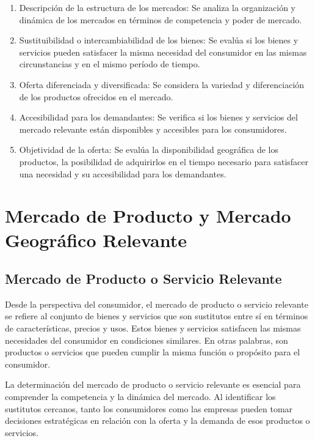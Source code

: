 \documentclass[
  letterpaper,
  DIV=11,
  numbers=noendperiod]{scrartcl}
\begin{document}
\begin{enumerate}
\def\labelenumi{\arabic{enumi}.}
\item
  Descripción de la estructura de los mercados: Se analiza la
  organización y dinámica de los mercados en términos de competencia y
  poder de mercado.
\item
  Sustituibilidad o intercambiabilidad de los bienes: Se evalúa si los
  bienes y servicios pueden satisfacer la misma necesidad del consumidor
  en las mismas circunstancias y en el mismo período de tiempo.
\item
  Oferta diferenciada y diversificada: Se considera la variedad y
  diferenciación de los productos ofrecidos en el mercado.
\item
  Accesibilidad para los demandantes: Se verifica si los bienes y
  servicios del mercado relevante están disponibles y accesibles para
  los consumidores.
\item
  Objetividad de la oferta: Se evalúa la disponibilidad geográfica de
  los productos, la posibilidad de adquirirlos en el tiempo necesario
  para satisfacer una necesidad y su accesibilidad para los demandantes.
\end{enumerate}

\hypertarget{mercado-de-producto-y-mercado-geogruxe1fico-relevante}{%
\section{Mercado de Producto y Mercado Geográfico
Relevante}\label{mercado-de-producto-y-mercado-geogruxe1fico-relevante}}

\hypertarget{mercado-de-producto-o-servicio-relevante}{%
\subsection{Mercado de Producto o Servicio
Relevante}\label{mercado-de-producto-o-servicio-relevante}}

Desde la perspectiva del consumidor, el mercado de producto o servicio
relevante se refiere al conjunto de bienes y servicios que son
sustitutos entre sí en términos de características, precios y usos.
Estos bienes y servicios satisfacen las mismas necesidades del
consumidor en condiciones similares. En otras palabras, son productos o
servicios que pueden cumplir la misma función o propósito para el
consumidor.

La determinación del mercado de producto o servicio relevante es
esencial para comprender la competencia y la dinámica del mercado. Al
identificar los sustitutos cercanos, tanto los consumidores como las
empresas pueden tomar decisiones estratégicas en relación con la oferta
y la demanda de esos productos o servicios.
\end{document}
